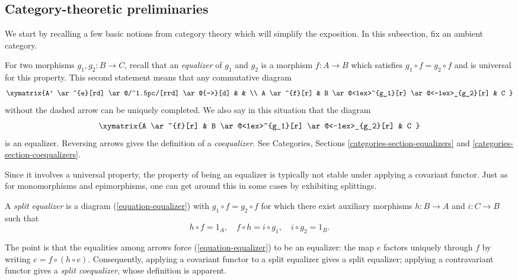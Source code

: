 \subsection{Category-theoretic preliminaries}
\label{subsection-category-prelims}

\noindent
We start by recalling a few basic notions from category theory which will 
simplify the exposition. In this subsection, fix an ambient category.

\medskip\noindent
For two morphisms $g_1, g_2: B \to C$, recall that an {\it equalizer}
of $g_1$ and $g_2$  is a morphism $f: A \to B$ which satisfies
$g_1 \circ f = g_2 \circ f$ and is universal for this property.
This second statement means that any commutative diagram 
$$
\xymatrix{A' \ar^{e}[rd] \ar@/^1.5pc/[rrd] \ar@{-->}[d] & & \\
A \ar^{f}[r] & B \ar@<1ex>^{g_1}[r] \ar@<-1ex>_{g_2}[r] & 
C
}
$$
without the dashed arrow can be uniquely completed. We also say in this 
situation that the diagram
\begin{equation}
\label{equation-equalizer}
\xymatrix{A \ar^{f}[r]  & B \ar@<1ex>^{g_1}[r] \ar@<-1ex>_{g_2}[r] & 
C
}
\end{equation}
is an equalizer. Reversing arrows gives the definition of a {\it coequalizer}.
See Categories, Sections \ref{categories-section-equalizers} and
\ref{categories-section-coequalizers}.

\medskip\noindent
Since it involves a universal property, the property of being an equalizer is 
typically not stable under applying a covariant functor. Just as for
monomorphisms and epimorphisms, one can get around this in some
cases by exhibiting splittings.

\begin{definition}
\label{definition-split-equalizer}
A {\it split equalizer} is a diagram (\ref{equation-equalizer}) with
$g_1 \circ f = g_2 \circ f$ for which there exist auxiliary morphisms
$h : B \to A$ and $i : C \to B$ such that
\begin{equation}
\label{equation-split-equalizer-conditions}
h \circ f = 1_A, \quad f \circ h = i \circ g_1, \quad i \circ g_2 = 1_B.
\end{equation}
\end{definition}

\noindent
The point is that the equalities among arrows force (\ref{equation-equalizer}) 
to be an equalizer: the map $e$ factors uniquely through $f$ by writing
$e = f \circ (h \circ e)$. Consequently, applying a covariant functor
to a split equalizer gives a split equalizer; applying a contravariant functor 
gives a {\it split coequalizer}, whose definition is apparent.

